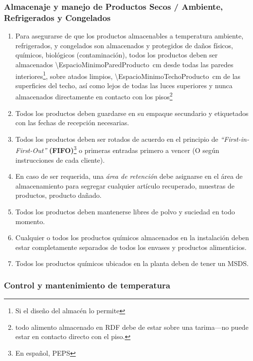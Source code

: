 \subsubsection{Almacenaje y manejo de Productos Secos / Ambiente, Refrigerados y Congelados}
\begin{enumerate}
	\item Para asegurarse de que los productos almacenables a temperatura ambiente, refrigerados, y congelados son almacenados y protegidos de daños físicos, químicos, biológicos (contaminación), todos los productos deben ser almacenados \qty{\EspacioMinimoParedProducto}{\centi\meter} desde todas las paredes interiores\footnote{Si el diseño del almacén lo permite}, sobre atados limpios, \qty{\EspacioMinimoTechoProducto}{\centi\meter} de las superficies del techo, así como lejos de todas las luces superiores y nunca almacenados directamente en contacto con los pisos\footnote{todo \gls{alimento} almacenado en \gls{RDF} debe de estar sobre una tarima---no puede estar en contacto directo con el piso.}
	\item Todos los productos deben guardarse en su empaque secundario y etiquetados con las fechas de recepción necesarias.
	\item Todos los productos deben ser rotados de acuerdo en el principio de  \textit{“First-in-First-Out”} \textbf{(FIFO)}\footnote{En español, \gls{PEPS}} o primeras entradas primero a vencer (O según instrucciones de cada cliente).
	\item En caso de ser requerida, una \emph{área de retención} debe asignarse en el área de almacenamiento para segregar cualquier artículo recuperado, muestras de productos, producto dañado. 
	\item Todos los productos deben mantenerse libres de polvo y suciedad en todo momento.
	\item Cualquier o todos los productos químicos almacenados en la instalación deben estar completamente separados de todos los envases y productos alimenticios.
	\item Todos los productos químicos ubicados en la planta deben de tener un MSDS.
\end{enumerate}

\subsubsection{Control y mantenimiento de temperatura}

